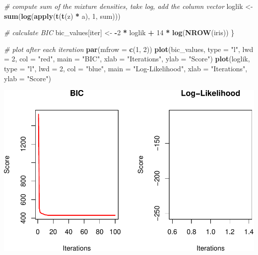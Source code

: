 \documentclass[12pt]{article}
\newenvironment{Shaded}{\begin{snugshade}}{\end{snugshade}}
\newcommand{\AttributeTok}[1]{\textcolor[rgb]{0.13,0.29,0.53}{#1}}
\newcommand{\CommentTok}[1]{\textcolor[rgb]{0.56,0.35,0.01}{\textit{#1}}}
\newcommand{\DecValTok}[1]{\textcolor[rgb]{0.00,0.00,0.81}{#1}}
\newcommand{\FunctionTok}[1]{\textcolor[rgb]{0.13,0.29,0.53}{\textbf{#1}}}
\newcommand{\NormalTok}[1]{#1}
\newcommand{\OtherTok}[1]{\textcolor[rgb]{0.56,0.35,0.01}{#1}}
\newcommand{\SpecialCharTok}[1]{\textcolor[rgb]{0.81,0.36,0.00}{\textbf{#1}}}
\newcommand{\StringTok}[1]{\textcolor[rgb]{0.31,0.60,0.02}{#1}}
\begin{document}
\begin{Shaded}
\begin{Highlighting}[]
\CommentTok{\# compute sum of the mixture densities, take log, add the column vector}
\NormalTok{loglik }\OtherTok{\textless{}{-}} \FunctionTok{sum}\NormalTok{(}\FunctionTok{log}\NormalTok{(}\FunctionTok{apply}\NormalTok{(}\FunctionTok{t}\NormalTok{(}\FunctionTok{t}\NormalTok{(z) }\SpecialCharTok{*}\NormalTok{ a), }\DecValTok{1}\NormalTok{, sum)))}

\CommentTok{\# calculate BIC}
\NormalTok{bic\_values[iter] }\OtherTok{\textless{}{-}} \SpecialCharTok{{-}}\DecValTok{2} \SpecialCharTok{*}\NormalTok{ loglik }\SpecialCharTok{+} \DecValTok{14} \SpecialCharTok{*} \FunctionTok{log}\NormalTok{(}\FunctionTok{NROW}\NormalTok{(iris))}
\NormalTok{\}}

\CommentTok{\# plot after each iteration}
\FunctionTok{par}\NormalTok{(}\AttributeTok{mfrow =} \FunctionTok{c}\NormalTok{(}\DecValTok{1}\NormalTok{, }\DecValTok{2}\NormalTok{))}
\FunctionTok{plot}\NormalTok{(bic\_values, }\AttributeTok{type =} \StringTok{"l"}\NormalTok{, }\AttributeTok{lwd =} \DecValTok{2}\NormalTok{, }\AttributeTok{col =} \StringTok{"red"}\NormalTok{, }\AttributeTok{main =} \StringTok{"BIC"}\NormalTok{, }\AttributeTok{xlab =} \StringTok{"Iterations"}\NormalTok{, }
    \AttributeTok{ylab =} \StringTok{"Score"}\NormalTok{)}
\FunctionTok{plot}\NormalTok{(loglik, }\AttributeTok{type =} \StringTok{"l"}\NormalTok{, }\AttributeTok{lwd =} \DecValTok{2}\NormalTok{, }\AttributeTok{col =} \StringTok{"blue"}\NormalTok{, }\AttributeTok{main =} \StringTok{"Log{-}Likelihood"}\NormalTok{, }
    \AttributeTok{xlab =} \StringTok{"Iterations"}\NormalTok{, }\AttributeTok{ylab =} \StringTok{"Score"}\NormalTok{)}
\end{Highlighting}
\end{Shaded}

\includegraphics{ProjectDraftForPeer_files/figure-latex/unnamed-chunk-5-2.pdf}
\end{document}

